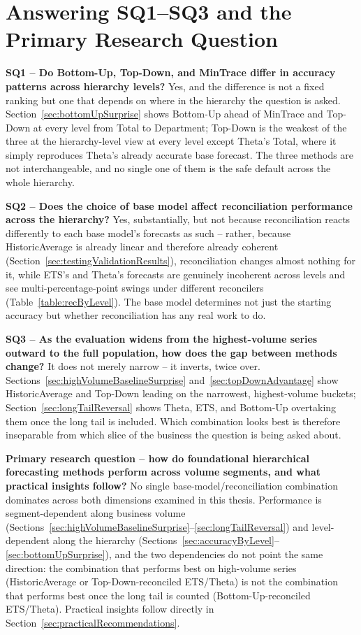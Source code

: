 \section{Answering SQ1--SQ3 and the Primary Research Question}
\label{sec:answeringSQs}

\textbf{SQ1 -- Do Bottom-Up, Top-Down, and MinTrace differ in accuracy patterns across hierarchy levels?} Yes, and the difference is not a fixed ranking but one that depends on where in the hierarchy the question is asked. Section~\ref{sec:bottomUpSurprise} shows Bottom-Up ahead of MinTrace and Top-Down at every level from Total to Department; Top-Down is the weakest of the three at the hierarchy-level view at every level except Theta's Total, where it simply reproduces Theta's already accurate base forecast. The three methods are not interchangeable, and no single one of them is the safe default across the whole hierarchy.

\textbf{SQ2 -- Does the choice of base model affect reconciliation performance across the hierarchy?} Yes, substantially, but not because reconciliation reacts differently to each base model's forecasts as such -- rather, because HistoricAverage is already linear and therefore already coherent (Section~\ref{sec:testingValidationResults}), reconciliation changes almost nothing for it, while ETS's and Theta's forecasts are genuinely incoherent across levels and see multi-percentage-point swings under different reconcilers (Table~\ref{table:recByLevel}). The base model determines not just the starting accuracy but whether reconciliation has any real work to do.

\textbf{SQ3 -- As the evaluation widens from the highest-volume series outward to the full population, how does the gap between methods change?} It does not merely narrow -- it inverts, twice over. Sections~\ref{sec:highVolumeBaselineSurprise} and~\ref{sec:topDownAdvantage} show HistoricAverage and Top-Down leading on the narrowest, highest-volume buckets; Section~\ref{sec:longTailReversal} shows Theta, ETS, and Bottom-Up overtaking them once the long tail is included. Which combination looks best is therefore inseparable from which slice of the business the question is being asked about.

\textbf{Primary research question -- how do foundational hierarchical forecasting methods perform across volume segments, and what practical insights follow?} No single base-model/reconciliation combination dominates across both dimensions examined in this thesis. Performance is segment-dependent along business volume (Sections~\ref{sec:highVolumeBaselineSurprise}--\ref{sec:longTailReversal}) and level-dependent along the hierarchy (Sections~\ref{sec:accuracyByLevel}--\ref{sec:bottomUpSurprise}), and the two dependencies do not point the same direction: the combination that performs best on high-volume series (HistoricAverage or Top-Down-reconciled ETS/Theta) is not the combination that performs best once the long tail is counted (Bottom-Up-reconciled ETS/Theta). Practical insights follow directly in Section~\ref{sec:practicalRecommendations}.

